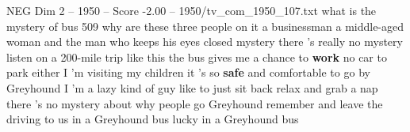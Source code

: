 \begin{textsample}{NEG Dim 2 – 1950 – Score -2.00 – 1950/tv\_com\_1950\_107.txt}  \label{ex:f2_neg_087}
what is the mystery of bus 509 why are these three people on it a businessman a middle-aged woman and the man who keeps his eyes closed mystery there 's really no mystery listen on a 200-mile trip like this the bus gives me a chance to \textbf{work} no car to park either I 'm visiting my children it 's so \textbf{safe} and comfortable to go by Greyhound I 'm a lazy kind of guy like to just sit back relax and grab a nap there 's no mystery about why people go Greyhound remember and leave the driving to us in a Greyhound bus lucky in a Greyhound bus

\end{textsample}
